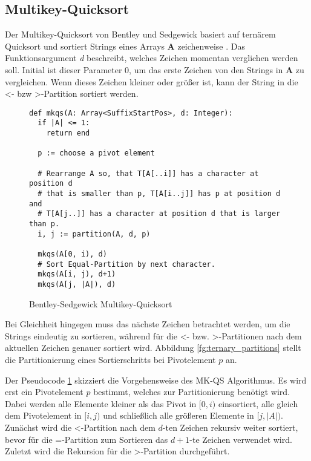 \subsection{Multikey-Quicksort}
\label{section:mkqs}
Der  Multikey-Quicksort von Bentley und Sedgewick basiert auf
ternärem Quicksort und sortiert Strings eines Arrays \textbf{A} zeichenweise \cite{multikey_quicksort}.
Das Funktionsargument \textit{d} beschreibt, welches Zeichen momentan verglichen werden soll.
Initial ist dieser Parameter 0, um das erste Zeichen von den Strings in \textbf{A} zu vergleichen.
Wenn dieses Zeichen kleiner oder größer ist, kann der String in die \glqq <\grqq- bzw \glqq >\grqq-Partition sortiert werden.

\begin{figure}
	\begin{verbatim}
def mkqs(A: Array<SuffixStartPos>, d: Integer):
  if |A| <= 1:
    return end

  p := choose a pivot element

  # Rearrange A so, that T[A[..i]] has a character at position d
  # that is smaller than p, T[A[i..j]] has p at position d and 
  # T[A[j..]] has a character at position d that is larger than p.
  i, j := partition(A, d, p)

  mkqs(A[0, i), d)
  # Sort Equal-Partition by next character.
  mkqs(A[i, j), d+1)
  mkqs(A[j, |A|), d)
	\end{verbatim}
	\caption{Bentley-Sedgewick Multikey-Quicksort~\cite{multikey_quicksort}}
	\label{alg:mkqs}
\end{figure}

Bei Gleichheit hingegen muss das nächste Zeichen betrachtet werden,
um die Strings eindeutig zu sortieren, während für die \glqq <\grqq- bzw. \glqq >\grqq-Partitionen nach dem aktuellen Zeichen genauer sortiert wird.
Abbildung \ref{fg:ternary_partitions} stellt die Partitionierung eines Sortierschritts bei Pivotelement $p$ an.

Der Pseudocode \ref{alg:mkqs} skizziert die Vorgehensweise des MK-QS Algorithmus.
Es wird erst ein Pivotelement $p$ bestimmt, welches zur Partitionierung benötigt wird.
Dabei werden alle Elemente kleiner als das Pivot in $[0, i)$ einsortiert, alle gleich dem Pivotelement in $[i, j)$ und schließlich
alle größeren Elemente in $[j, |A|)$.
Zunächst wird die \glqq <\grqq-Partition nach dem $d$-ten Zeichen rekursiv
weiter sortiert, bevor für die \glqq =\grqq-Partition zum Sortieren das $d+1$-te Zeichen verwendet wird.
Zuletzt wird die Rekursion für die \glqq >\grqq-Partition durchgeführt.

